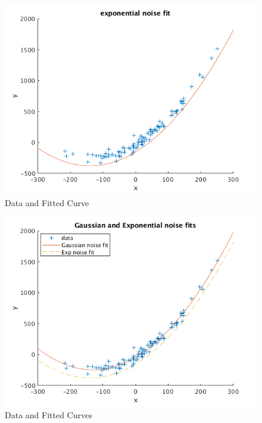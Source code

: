\documentclass[12pt,letter]{article}
\begin{document}
\begin{enumerate}
\begin{enumerate}
  \begin{figure}[H]
    \centering
    \includegraphics[width=13cm]{imgs/q8_b.png}
    \caption{Data and Fitted Curve}
    \label{label}
  \end{figure}

  \begin{figure}[H]
    \centering
    \includegraphics[width=13cm]{imgs/q8_overlay.png}
    \caption{Data and Fitted Curves}
    \label{label}
  \end{figure}
 
\end{enumerate}

\end{enumerate}
\end{document}
